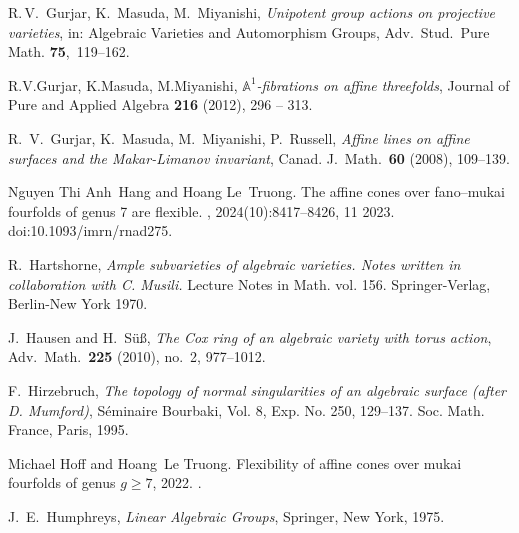 R.\,V.~Gurjar, K.~Masuda, M.~Miyanishi,
      \emph{Unipotent group actions on projective varieties},
      in: Algebraic Varieties and Automorphism Groups,
      Adv.\ Stud.\ Pure Math. \textbf{75},~119--162.

R.V.Gurjar, K.Masuda, M.Miyanishi, \emph{$\mathbb{A}^1$-fibrations on affine threefolds}, Journal of Pure and Applied Algebra \textbf{216} (2012), 296 -- 313.

R.~V.~Gurjar, K.~Masuda, M.~Miyanishi, P.~Russell,
\emph{Affine lines on affine surfaces and the Makar-Limanov invariant},
Canad. J.\ Math.\ \textbf{60} (2008),  109--139.


Nguyen Thi Anh~Hang and Hoang Le~Truong.
\newblock The affine cones over fano--mukai fourfolds of genus 7 are flexible.
, 2024(10):8417--8426, 11 2023.
\newblock doi:10.1093/imrn/rnad275.

R.~Hartshorne,
\emph{Ample subvarieties of algebraic varieties.
Notes written in collaboration with C. Musili.}
Lecture Notes in Math. vol. 156. Springer-Verlag,
Berlin-New York 1970.


J.~Hausen and H.~S\"u\ss,
\emph{The Cox ring of an algebraic variety with torus action},
Adv.\ Math.\ \textbf{225} (2010), no.~2, 977--1012.

F.~Hirzebruch,
\emph{The topology of normal singularities
of an algebraic surface (after D. Mumford)},
S\'eminaire Bourbaki, Vol. 8, Exp. No. 250, 129--137.
Soc. Math. France, Paris, 1995.

Michael Hoff and Hoang~Le Truong.
\newblock Flexibility of affine cones over mukai fourfolds of genus $g\ge7$, 2022.
\newblock \href {https://arxiv.org/abs/2208.09109} {}.


J.~E.~Humphreys, \emph{Linear Algebraic Groups}, Springer, New York, 1975.


